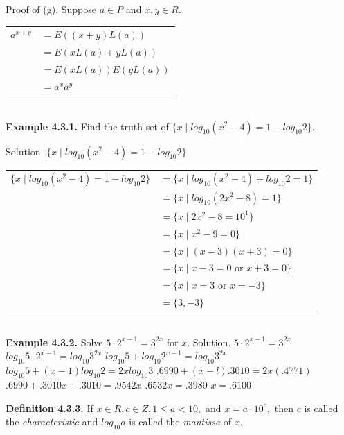 Proof of (g). Suppose $a\in P$ and $x,y\in R.$ \nl

\begin{tabular}{r l}

$a^{x + y}$&$= E((x+y)L(a))$\\
&$= E(xL(a)+yL(a))$\\
&$=E(xL(a))E(yL(a))$\\
&$=a^{x}a^{y}$\\
\end{tabular}\\

\textbf{Example 4.3.1.} Find the truth set of $\{x \mid log_{10}(x^{2} - 4) = 1 - log_{10}2\}.$\nl

Solution.  $\{x \mid log_{10}(x^{2} - 4) = 1 - log_{10}2\}$

\newpage


\begin{tabular}{r l}
$\{x \mid log_{10}(x^{2} - 4) = 1 - log_{10}2\}$& $= \{x \mid log_{10}(x^{2} - 4) + log_{10}2 = 1\}$ \\
&$= \{x \mid log_{10}(2x^{2} -8) = 1\}$\\
&$= \{x \mid 2x^{2} - 8 = 10^{1}\}$\\
&$= \{x \mid x^{2} - 9 = 0\}$\\
&$= \{x \mid (x-3)(x+3) = 0\}$\\
&$= \{x \mid x-3 = 0$ or $x + 3 = 0\}$\\
&$= \{x \mid x = 3$ or $x = -3\}$\\
&$= \{3, -3\}$\\
\end{tabular}\\



\textbf{Example 4.3.2.} Solve $5\cdot 2^{x-1} =3^{2x}$ for $x.$\nl
Solution. \nl
$5\cdot 2^{x-1} =3^{2x}$ \nl
$log_{10}5\cdot 2^{x-1} = log_{10}3^{2x}$ \nl
$log_{10}5 + log_{10}2^{x-1} = log_{10}3^{2x}$\nl
$log_{10}5 + (x-1)log_{10}2 = 2x log_{10}3$ \nl
$.6990+(x-l).3010 = 2x(.4771)$ \nl
$.6990 + .3010x -.3010 = .9542x$ \nl
$.6532x = .3980$ \nl
$x=.6100$ \nl

\textbf{Definition 4.3.3.} If $x\in R, c\in Z, 1 \leq a < 10,$ and $x=a\cdot 10^{c},$ then $c$ is called the \textit{characteristic} and $log_{10}a$  is called the \textit{mantissa} of $x.$\nl


